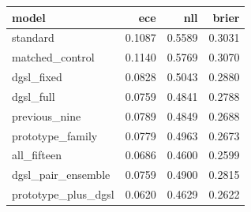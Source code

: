 \begin{tabular}{lrrr}
\toprule
model & ece & nll & brier \\
\midrule
standard & 0.1087 & 0.5589 & 0.3031 \\
matched\_control & 0.1140 & 0.5769 & 0.3070 \\
dgsl\_fixed & 0.0828 & 0.5043 & 0.2880 \\
dgsl\_full & 0.0759 & 0.4841 & 0.2788 \\
previous\_nine & 0.0789 & 0.4849 & 0.2688 \\
prototype\_family & 0.0779 & 0.4963 & 0.2673 \\
all\_fifteen & 0.0686 & 0.4600 & 0.2599 \\
dgsl\_pair\_ensemble & 0.0759 & 0.4900 & 0.2815 \\
prototype\_plus\_dgsl & 0.0620 & 0.4629 & 0.2622 \\
\bottomrule
\end{tabular}
